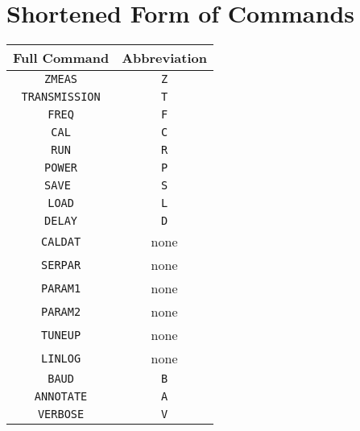 \section{Shortened Form of Commands}
\label{subsect:SerShort}
\begin{center}
\begin{tabular}{|c||c|} \hline
\textbf{Full Command}   &  \textbf{Abbreviation}  \\ \hline \hline
\texttt{ZMEAS}    &   \texttt{Z} \\ \hline
\texttt{TRANSMISSION}   &   \texttt{T} \\ \hline
\texttt{FREQ}   &   \texttt{F} \\ \hline
\texttt{CAL}   &   \texttt{C} \\ \hline
\texttt{RUN}   &  \texttt{R} \\ \hline
\texttt{POWER}    &  \texttt{P}  \\ \hline
\texttt{SAVE }   &   \texttt{S}  \\ \hline
\texttt{LOAD}    &   \texttt{L}  \\ \hline
\texttt{DELAY}    &   \texttt{D}  \\ \hline
\texttt{CALDAT}   &    none \\ \hline
\texttt{SERPAR}   &   none   \\ \hline
\texttt{PARAM1}   &   none  \\ \hline
\texttt{PARAM2}   &   none  \\ \hline
\texttt{TUNEUP}   &   none  \\ \hline
\texttt{LINLOG}    &    none  \\ \hline
\texttt{BAUD}        &   \texttt{B}  \\ \hline
\texttt{ANNOTATE}   &   \texttt{A}  \\ \hline
\texttt{VERBOSE}     &   \texttt{V}  \\ \hline

\end{tabular}
\end{center}

